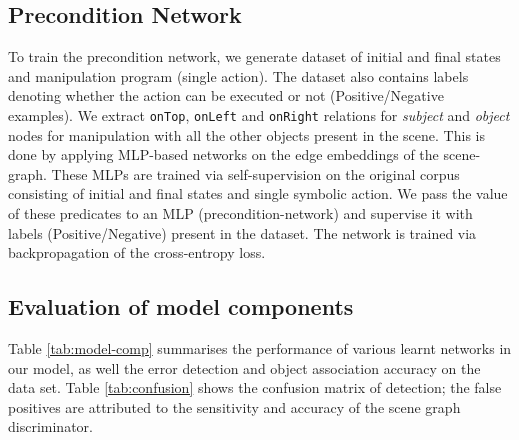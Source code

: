 \subsection{Precondition Network}
To train the precondition network, we generate dataset of initial and final states and manipulation program (single action). The dataset also contains labels denoting whether the action can be executed or not (Positive/Negative examples). We extract \texttt{onTop}, \texttt{onLeft} and \texttt{onRight} relations for \textit{subject} and \textit{object} nodes for manipulation with all the other objects present in the scene. This is done by applying MLP-based networks on the edge embeddings of the scene-graph. These MLPs are trained via self-supervision on the original corpus consisting of initial and final states and single symbolic action. We pass the value of these predicates to an MLP (precondition-network) and supervise it with labels (Positive/Negative) present in the dataset. The network is trained via backpropagation of the cross-entropy loss.

\subsection{Evaluation of model components}

Table \ref{tab:model-comp} summarises the performance of various learnt networks in our model, as well the error detection and object association accuracy on the data set. Table \ref{tab:confusion} shows the confusion matrix of detection; the false positives are attributed to the sensitivity and accuracy of the scene graph discriminator.

